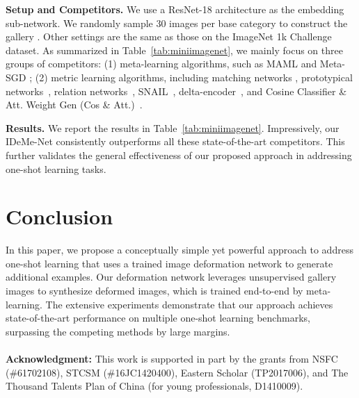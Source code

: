 \documentclass[10pt,letterpaper,twocolumn]{article}
\begin{document}
\noindent \textbf{Setup and Competitors.} We use a ResNet-18 architecture
as the embedding sub-network. We randomly sample 30 images per base
category to construct the gallery . Other settings are the same as
those on the ImageNet 1k Challenge dataset. As summarized in Table~\ref{tab:miniimagenet},
we mainly focus on three groups of  competitors: (1) meta-learning
algorithms, such as MAML \cite{MAML} and Meta-SGD \cite{meta-sgd};
(2) metric learning algorithms, including matching networks \cite{matchingnet_1shot},
prototypical networks~\cite{prototype_network}, relation networks~\cite{relation_net}, SNAIL~\cite{SNAIL}, delta-encoder~\cite{Delta-encoder},
and Cosine Classifier \& Att. Weight Gen (Cos \& Att.)~\cite{dym}.

\noindent \textbf{Results. }We report the results in Table~\ref{tab:miniimagenet}. Impressively, our IDeMe-Net consistently outperforms all these
state-of-the-art competitors. This further validates the general effectiveness
of our proposed approach in addressing one-shot learning tasks.

\section{Conclusion}

In this paper, we propose a conceptually simple yet powerful approach
to address one-shot learning that uses a trained image deformation
network to generate additional examples. Our deformation network leverages
unsupervised gallery images to synthesize deformed images, which is
trained end-to-end by meta-learning. The extensive experiments demonstrate
that our approach achieves state-of-the-art performance on multiple
one-shot learning benchmarks, surpassing the competing methods
by large margins.
\\
\\
\indent \textbf{Acknowledgment:} This work is supported in part by the grants from NSFC (\#61702108),   STCSM (\#16JC1420400), Eastern Scholar (TP2017006), and The Thousand Talents Plan of China (for young professionals, D1410009).

 

\end{document}
